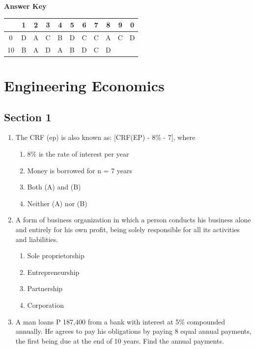 \documentclass[11pt,a4paper]{article}
\begin{document}
\textbf{Answer Key}
\begin{tabular}{ | c | c c c c c c c c c c | }
\hline
 & 1 & 2 & 3 & 4 & 5 & 6 & 7 & 8 & 9 & 0 \\
\hline
0 & D & A & C & B & D & C & C & A & C & D \\
10 & B & A & D & A & B & D & C & D &   &   \\
\hline
\end{tabular}
\clearpage
\section{Engineering Economics}
\subsection*{Section 1}
\begin{enumerate}
\item{The CRF (ep) is also known as: [CRF(EP) - 8\% - 7], where}
\begin{enumerate}[label=\Alph*.]
\item{8\% is the rate of interest per year}
\item{Money is borrowed for n = 7 years}
\item{Both (A) and (B)}
\item{Neither (A) nor (B)}
\end{enumerate}
\item{A form of business organization in which a person conducts his business alone and entirely for his own profit, being solely responsible for all its activities and liabilities.}
\begin{enumerate}[label=\Alph*.]
\item{Sole proprietorship}
\item{Entrepreneurship}
\item{Partnership}
\item{Corporation}
\end{enumerate}
\item{A man loans P 187,400 from a bank with interest at 5\% compounded annually. He agrees to pay his obligations by paying 8 equal annual payments, the first being due at the end of 10 years. Find the annual payments.}
\\
\end{enumerate}
\end{document}
